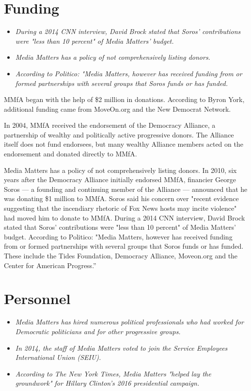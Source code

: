 \section{Funding}\label{funding}

\begin{itemize}
\item
  \emph{During a 2014 CNN interview, David Brock stated that Soros'
  contributions were "less than 10 percent" of Media Matters' budget.}
\item
  \emph{Media Matters has a policy of not comprehensively listing
  donors.}
\item
  \emph{According to Politico: "Media Matters, however has received
  funding from or formed partnerships with several groups that Soros
  funds or has funded.}
\end{itemize}

MMfA began with the help of \$2 million in donations. According to Byron
York, additional funding came from MoveOn.org and the New Democrat
Network.

In 2004, MMfA received the endorsement of the Democracy Alliance, a
partnership of wealthy and politically active progressive donors. The
Alliance itself does not fund endorsees, but many wealthy Alliance
members acted on the endorsement and donated directly to MMfA.

Media Matters has a policy of not comprehensively listing donors. In
2010, six years after the Democracy Alliance initially endorsed MMfA,
financier George Soros --- a founding and continuing member of the
Alliance --- announced that he was donating \$1 million to MMfA. Soros
said his concern over "recent evidence suggesting that the incendiary
rhetoric of Fox News hosts may incite violence" had moved him to donate
to MMfA. During a 2014 CNN interview, David Brock stated that Soros'
contributions were "less than 10 percent" of Media Matters' budget.
According to Politico: "Media Matters, however has received funding from
or formed partnerships with several groups that Soros funds or has
funded. These include the Tides Foundation, Democracy Alliance,
Moveon.org and the Center for American Progress.''

\section{Personnel}\label{personnel}

\begin{itemize}
\item
  \emph{Media Matters has hired numerous political professionals who had
  worked for Democratic politicians and for other progressive groups.}
\item
  \emph{In 2014, the staff of Media Matters voted to join the Service
  Employees International Union (SEIU).}
\item
  \emph{According to The New York Times, Media Matters "helped lay the
  groundwork" for Hillary Clinton's 2016 presidential campaign.}
\end{itemize}

